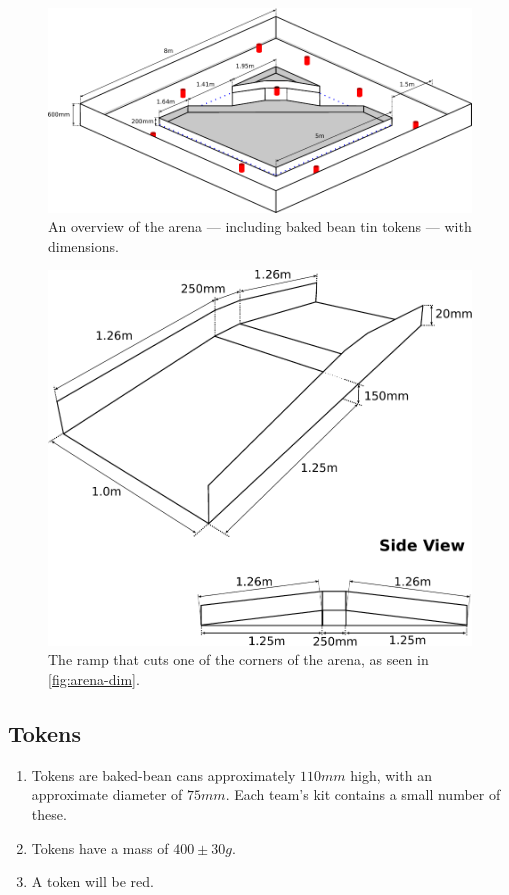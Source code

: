 \begin{figure}
  \includegraphics[keepaspectratio, clip, width=\textwidth]{./images/sr2011-arena.pdf}
  \caption{\label{fig:arena-dim}An overview of the arena --- including baked bean tin tokens --- with dimensions.}
\end{figure}

\begin{figure}
  \begin{center}
    \includegraphics[keepaspectratio,width=\textwidth]{./images/ramp-2011.pdf}
  \end{center}
  \caption{\label{fig:ramp-on-its-own}The ramp that cuts one of the corners of the arena, as seen in \autoref{fig:arena-dim}.}
\end{figure}

\subsection{Tokens}
\label{sub:Tokens}
\begin {enumerate}
\item Tokens are baked-bean cans approximately $110mm$ high, with an approximate diameter of $75mm$.
 Each team's kit contains a small number of these.
\item Tokens have a mass of $400\pm{}30g$.
\item A token will be red.
\end {enumerate}

